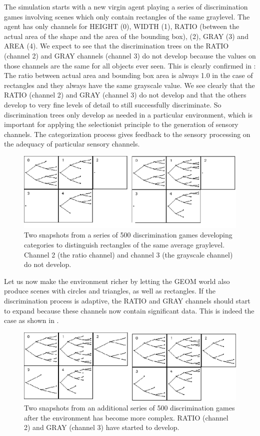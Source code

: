 The simulation starts with a new virgin agent 
playing a series of discrimination games involving scenes
which only contain rectangles of the same graylevel. 
The agent has only channels for HEIGHT (0), WIDTH (1), 
RATIO (between the actual area of the shape 
and the area of the bounding box),
(2), GRAY (3) and AREA (4). We expect
to see that the discrimination trees on the RATIO (channel 
2) and GRAY channels (channel 3) do not develop because 
the values on those channels 
are the same for all objects ever seen. This is 
clearly confirmed in : The ratio
between actual area and bounding box area is always 1.0
in the case of rectangles and they always have the same
grayscale value. 
We see clearly that the RATIO (channel 2) and GRAY (channel 3) 
do not develop and that the others develop to very 
fine levels of detail to still successfully discriminate. 
So discrimination trees only 
develop as needed in a particular environment, which is 
important for applying the selectionist
principle to the generation of sensory channels. 
The categorization process gives feedback to 
the sensory processing on the adequacy of particular sensory 
channels. 
\begin{figure}[htbp]
  \centerline{\includegraphics[width=.65\textwidth]{chap4/figs/adptwrl1}}
\caption{\label{adptwrl1} Two snapshots 
from a series of 500 discrimination 
games developing categories to distinguish rectangles of 
the same average graylevel. Channel 2 (the ratio channel) 
and channel 3 (the grayscale channel) do not develop.}
\end{figure}

Let us now make the environment richer by letting the 
GEOM world also produce scenes with circles and triangles, 
as well as rectangles. If the discrimination 
process is adaptive, the RATIO and GRAY channels should
start to expand because these channels now contain
significant data. This is indeed the case as shown 
in . 
\begin{figure}[htbp]
  \centerline{\includegraphics[width=.65\textwidth]{chap4/figs/adptwrl2}}
\caption{\label{adptwrl2} Two snapshots from 
an additional series of 500 discrimination games after
the environment has become more complex. RATIO
(channel 2) and GRAY (channel 3) have started to develop.}
\end{figure}

